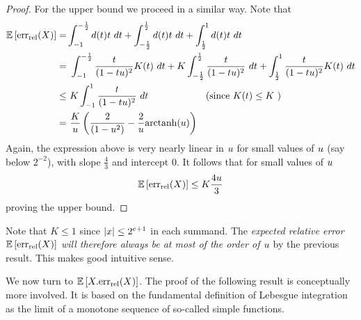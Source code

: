 \begin{proof}
For the upper bound we proceed in a similar way. Note that 
\begin{align*}
\mathbb{E}\left[\mathrm{err}_{\mathrm{rel}}(X)\right] =  &\int_{-1}^{-\frac{1}{2}}d(t) t~dt + \int_{-\frac{1}{2}}^{\frac{1}{2}}d(t) t~dt +\int_{\frac{1}{2}}^1d(t) t~dt
\\
= &
~\int_{-1}^{-\frac{1}{2}}\frac{t}{(1-tu)^2}K(t) ~dt +
K \int_{-\frac{1}{2}}^{\frac{1}{2}}\frac{t}{(1-tu)^2} ~dt + \int_{\frac{1}{2}}^1\frac{t}{(1-tu)^2} K(t) ~dt
\\
\leq & ~K \int_{-1}^{1}\frac{t}{(1-tu)^2}~dt\qquad\qquad\qquad\text{(since }K(t)\leq K\text{ )}
\\
= & ~ \frac{K}{u} \left(\frac{2}{(1-u^2)} - \frac{2}{u} \mathrm{arctanh}(u) \right)
\end{align*}
Again, the expression above is very nearly linear in $u$ for small values of $u$ (say below $2^{-2}$), with slope $\frac{4}{3}$ and intercept 0. It follows that for small values of $u$
\[
\mathbb{E}\left[\mathrm{err}_{\mathrm{rel}}(X)\right]\leq K\frac{4u}{3}
\]
proving the upper bound.
\flushright{$\square$}
\end{proof}
Note that $K\leq 1$ since $\left\lvert x\right\rvert\leq 2^{e+1}$ in each summand. The \emph{expected relative error $\mathbb{E}\left[\mathrm{err}_{\mathrm{rel}}(X)\right]$ will therefore always be at most of the order of $u$} by the previous result. This makes good intuitive sense.

We now turn to $\mathbb{E}\left[X.\mathrm{err}_{\mathrm{rel}}(X)\right]$. The proof of the following result is conceptually more involved. It is based on the fundamental definition of Lebesgue integration as the limit of a monotone sequence of so-called simple functions. 

